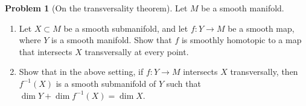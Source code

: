 \documentclass[reqno]{amsart}
\theoremstyle{definition}
\newtheorem{problem}[theorem]{Problem}
\theoremstyle{remark}
\begin{document}
    \begin{problem}[On the transversality theorem]
        Let $M$ be a smooth manifold.
        \begin{enumerate}
            \item Let $X \subset M$ be a smooth
                submanifold, and let $f \colon Y \to M$ 
                be a smooth map, where
                $Y$ is a smooth manifold. Show that
                $f$ is smoothly homotopic to a map that
                intersects $X$ transversally at every
                point.
            \item Show that in the above setting, if
                $f \colon Y \to M$ intersects $X$ transversally,
                then $f^{-1}(X)$ is a smooth submanifold
                of $Y$ such that $\dim Y + \dim
                f^{-1}(X) = \dim X$.
        \end{enumerate}
    \end{problem}
\end{document}
